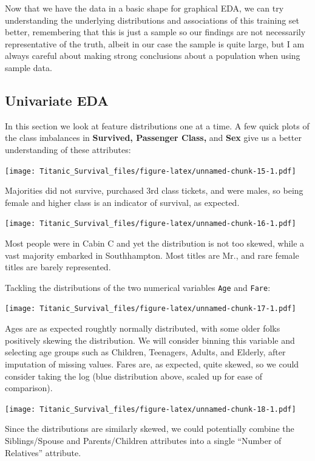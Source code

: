 \documentclass[]{article}
\begin{document}
Now that we have the data in a basic shape for graphical EDA, we can try
understanding the underlying distributions and associations of this
training set better, remembering that this is just a sample so our
findings are not necessarily representative of the truth, albeit in our
case the sample is quite large, but I am always careful about making
strong conclusions about a population when using sample data.

\subsection{Univariate EDA}\label{univariate-eda}

In this section we look at feature distributions one at a time. A few
quick plots of the class imbalances in \textbf{Survived, Passenger
Class,} and \textbf{Sex} give us a better understanding of these
attributes:

\texttt{[image: Titanic\_Survival\_files/figure-latex/unnamed-chunk-15-1.pdf]}

Majorities did not survive, purchased 3rd class tickets, and were males,
so being female and higher class is an indicator of survival, as
expected.

\texttt{[image: Titanic\_Survival\_files/figure-latex/unnamed-chunk-16-1.pdf]}

Most people were in Cabin C and yet the distribution is not too skewed,
while a vast majority embarked in Southhampton. Most titles are Mr., and
rare female titles are barely represented.

Tackling the distributions of the two numerical variables \texttt{Age}
and \texttt{Fare}:

\texttt{[image: Titanic\_Survival\_files/figure-latex/unnamed-chunk-17-1.pdf]}

Ages are as expected roughtly normally distributed, with some older
folks positively skewing the distribution. We will consider binning this
variable and selecting age groups such as Children, Teenagers, Adults,
and Elderly, after imputation of missing values. Fares are, as expected,
quite skewed, so we could consider taking the log (blue distribution
above, scaled up for ease of comparison).

\texttt{[image: Titanic\_Survival\_files/figure-latex/unnamed-chunk-18-1.pdf]}

Since the distributions are similarly skewed, we could potentially
combine the Siblings/Spouse and Parents/Children attributes into a
single ``Number of Relatives'' attribute.
\end{document}
